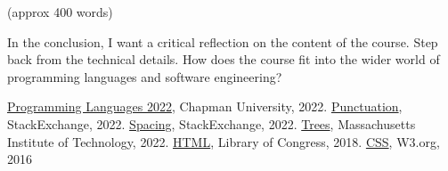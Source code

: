 \documentclass{article}
\theoremstyle{theorem}
\theoremstyle{definition}
\theoremstyle{remark}
\begin{document}
(approx 400 words)

In the conclusion, I want a critical reflection on the content of the course. Step back from the technical details. How does the course fit into the wider world of programming languages and software engineering?

\begin{thebibliography}{99}
 \href{https://github.com/alexhkurz/programming-languages-2022/blob/main/README.md}{Programming Languages 2022}, Chapman University, 2022.
 \href{https://tex.stackexchange.com/questions/2369/why-do-the-less-than-symbol-and-the-greater-than-symbol-appear-wrong-as}{Punctuation}, StackExchange, 2022.
 \href{https://tex.stackexchange.com/questions/14526/spaces-behind-textgreater-not-working-as-expected}{Spacing}, StackExchange, 2022.
 \href{http://sznfong.scripts.mit.edu/site/wp-content/uploads/2018/03/treedrawingtutorialv2.pdf}{Trees}, Massachusetts Institute of Technology, 2022.
\href{https://www.loc.gov/preservation/digital/formats/fdd/fdd000475.shtml}{HTML}, Library of Congress, 2018.
\href{https://www.w3.org/Style/CSS20/history.html}{CSS}, W3.org, 2016
\end{thebibliography}
\end{document}
